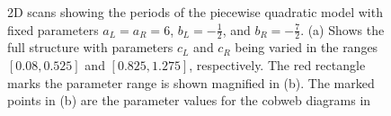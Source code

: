 \begin{figure}
	\centering
	\caption[2D scans showing periods of the skewed piecewise quadratic model]{
		2D scans showing the periods of the piecewise quadratic model with fixed parameters $a_L = a_R = 6$, $b_L = -\frac{1}{2}$, and $b_R = -\frac{7}{2}$.
		(a) Shows the full structure with parameters $c_L$ and $c_R$ being varied in the ranges $[0.08, 0.525]$ and $[0.825, 1.275]$, respectively.
		The red rectangle marks the parameter range is shown magnified in (b).
		The marked points in (b) are the parameter values for the cobweb diagrams in 
	}
	\label{fig:setup.quad.skew.period}
\end{figure}

